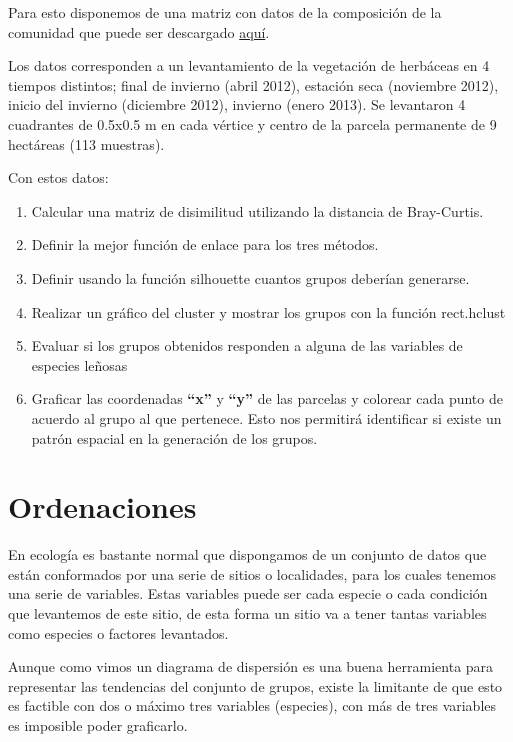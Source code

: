 \documentclass[]{book}
\begin{document}
Para esto disponemos de una matriz con datos de la composición de la
comunidad que puede ser descargado
\href{https://github.com/Ciespinosa/datos_practicas/blob/master/herbaceas.xlsx}{aquí}.

Los datos corresponden a un levantamiento de la vegetación de herbáceas
en 4 tiempos distintos; final de invierno (abril 2012), estación seca
(noviembre 2012), inicio del invierno (diciembre 2012), invierno (enero
2013). Se levantaron 4 cuadrantes de 0.5x0.5 m en cada vértice y centro
de la parcela permanente de 9 hectáreas (113 muestras).

Con estos datos:

\begin{enumerate}
\def\labelenumi{\arabic{enumi}.}
\item
  Calcular una matriz de disimilitud utilizando la distancia de
  Bray-Curtis.
\item
  Definir la mejor función de enlace para los tres métodos.
\item
  Definir usando la función silhouette cuantos grupos deberían
  generarse.
\item
  Realizar un gráfico del cluster y mostrar los grupos con la función
  rect.hclust
\item
  Evaluar si los grupos obtenidos responden a alguna de las variables de
  especies leñosas
\item
  Graficar las coordenadas \textbf{``x''} y \textbf{``y''} de las
  parcelas y colorear cada punto de acuerdo al grupo al que pertenece.
  Esto nos permitirá identificar si existe un patrón espacial en la
  generación de los grupos.
\end{enumerate}

\chapter{Ordenaciones}\label{ordenaciones}

En ecología es bastante normal que dispongamos de un conjunto de datos
que están conformados por una serie de sitios o localidades, para los
cuales tenemos una serie de variables. Estas variables puede ser cada
especie o cada condición que levantemos de este sitio, de esta forma un
sitio va a tener tantas variables como especies o factores levantados.

Aunque como vimos un diagrama de dispersión es una buena herramienta
para representar las tendencias del conjunto de grupos, existe la
limitante de que esto es factible con dos o máximo tres variables
(especies), con más de tres variables es imposible poder graficarlo.
\end{document}
